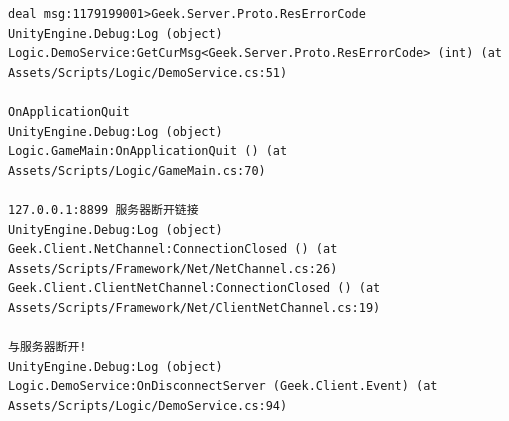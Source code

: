 \documentclass[9pt, b5paper]{article}
\begin{document}
\begin{verbatim}
deal msg:1179199001>Geek.Server.Proto.ResErrorCode
UnityEngine.Debug:Log (object)
Logic.DemoService:GetCurMsg<Geek.Server.Proto.ResErrorCode> (int) (at Assets/Scripts/Logic/DemoService.cs:51)

OnApplicationQuit
UnityEngine.Debug:Log (object)
Logic.GameMain:OnApplicationQuit () (at Assets/Scripts/Logic/GameMain.cs:70)

127.0.0.1:8899 服务器断开链接
UnityEngine.Debug:Log (object)
Geek.Client.NetChannel:ConnectionClosed () (at Assets/Scripts/Framework/Net/NetChannel.cs:26)
Geek.Client.ClientNetChannel:ConnectionClosed () (at Assets/Scripts/Framework/Net/ClientNetChannel.cs:19)

与服务器断开!
UnityEngine.Debug:Log (object)
Logic.DemoService:OnDisconnectServer (Geek.Client.Event) (at Assets/Scripts/Logic/DemoService.cs:94)
\end{verbatim}
\end{document}
